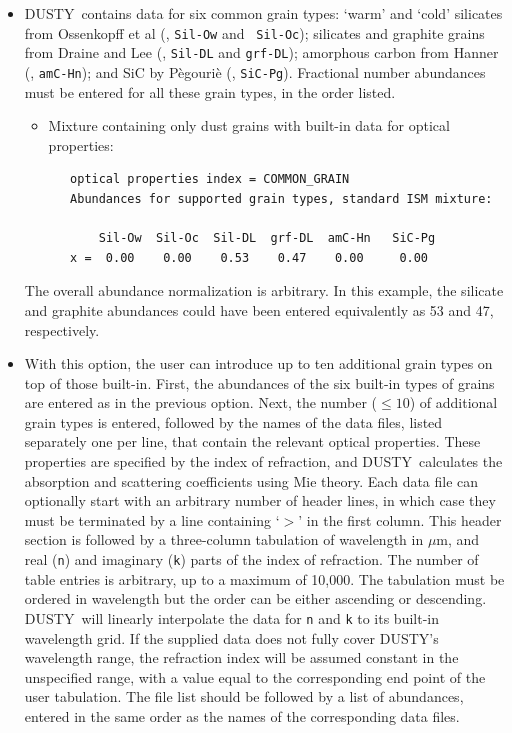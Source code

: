 \documentclass[11pt]{article}
\def\D    {{\sf DUSTY}}
\def\mic    {\hbox{$\mu$m}}
\begin{document}
\begin{itemize}

\item \D\ contains data for six common grain types: `warm' and `cold'
  silicates from Ossenkopff et al (\cite{Oss92}, {\tt Sil-Ow} and {\tt
    Sil-Oc}); silicates and graphite grains from Draine and Lee
  (\cite{DL84}, {\tt Sil-DL} and {\tt grf-DL}); amorphous carbon from
  Hanner (\cite{Hann88}, {\tt amC-Hn}); and SiC by P\`egouri\`e
  (\cite{Peg88}, {\tt SiC-Pg}).  Fractional number abundances must be
  entered for all these grain types, in the order listed.

  \begin{itemize}
  \item Mixture containing only dust grains with built-in data for
    optical properties:

\begin{verbatim}
   optical properties index = COMMON_GRAIN
   Abundances for supported grain types, standard ISM mixture:

       Sil-Ow  Sil-Oc  Sil-DL  grf-DL  amC-Hn   SiC-Pg
   x =  0.00    0.00    0.53    0.47    0.00     0.00
\end{verbatim}
  \end{itemize}
  The overall abundance normalization is arbitrary.  In this example,
  the silicate and graphite abundances could have been entered
  equivalently as 53 and 47, respectively.

\item With this option, the user can introduce up to ten additional
  grain types on top of those built-in.  First, the abundances of the
  six built-in types of grains are entered as in the previous
  option. Next, the number ($\le 10$) of additional grain types is
  entered, followed by the names of the data files, listed separately
  one per line, that contain the relevant optical properties. These
  properties are specified by the index of refraction, and \D\
  calculates the absorption and scattering coefficients using Mie
  theory.  Each data file can optionally start with an arbitrary
  number of header lines, in which case they must be terminated by a
  line containing `$>$' in the first column. This header section is
  followed by a three-column tabulation of wavelength in \mic, and
  real ({\tt n}) and imaginary ({\tt k}) parts of the index of
  refraction. The number of table entries is arbitrary, up to a
  maximum of 10,000. The tabulation must be ordered in wavelength but
  the order can be either ascending or descending. \D\ will linearly
  interpolate the data for {\tt n} and {\tt k} to its built-in
  wavelength grid. If the supplied data does not fully cover \D's
  wavelength range, the refraction index will be assumed constant in
  the unspecified range, with a value equal to the corresponding end
  point of the user tabulation. The file list should be followed by a
  list of abundances, entered in the same order as the names of the
  corresponding data files.


\end{itemize}
\end{document}
